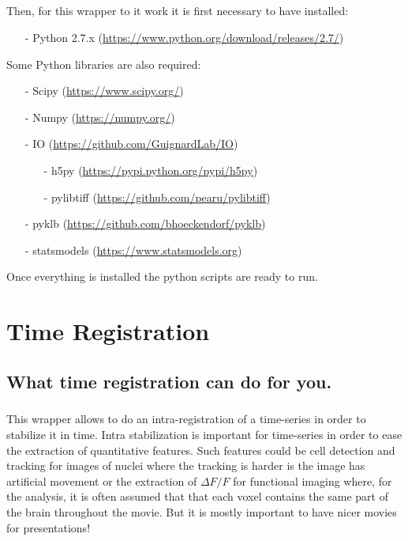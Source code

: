 \documentclass[10pt,a4paper]{book}
\begin{document}
{\paragraph{}Then, for this wrapper to it work it is first necessary to have installed:
\begin{enumerate}
\item[-] Python 2.7.x (\url{https://www.python.org/download/releases/2.7/})
\end{enumerate}
Some Python libraries are also required:
\begin{enumerate}
\item[-] Scipy (\url{https://www.scipy.org/})
\item[-] Numpy (\url{https://numpy.org/})
\item[-] IO (\url{https://github.com/GuignardLab/IO})
\begin{enumerate}
\item[-] h5py (\url{https://pypi.python.org/pypi/h5py})
\item[-] pylibtiff (\url{https://github.com/pearu/pylibtiff})
\end{enumerate}
\item[-] pyklb (\url{https://github.com/bhoeckendorf/pyklb})
\item[-] statsmodels (\url{https://www.statsmodels.org})
\end{enumerate}
Once everything is installed the python scripts are ready to run.}
\chapter{Time Registration}
\section{What time registration can do for you.}
\paragraph{}This wrapper allows to do an intra-registration of a time-series in order to stabilize it in time. Intra stabilization is important for time-series in order to ease the extraction of quantitative features. Such features could be cell detection and tracking for images of nuclei where the tracking is harder is the image has artificial movement or the extraction of $\Delta F/F$ for functional imaging where, for the analysis, it is often assumed that that each voxel contains the same part of the brain throughout the movie. But it is mostly important to have nicer movies for presentations!
\end{document}
